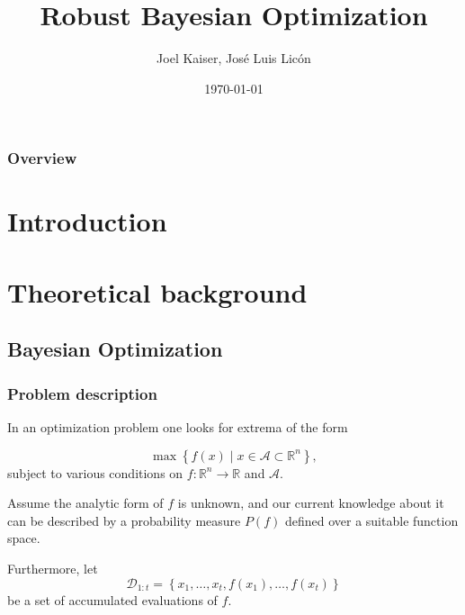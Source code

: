 \documentclass[10pt,handout]{beamer}
\title[RoBO]
{Robust Bayesian Optimization}
\author{Joel Kaiser, José Luis Licón}
\institute[Uni Freiburg] %
{
Albert-Ludwigs-Universität Freiburg \\ %
\medskip
}
\date{\today} %
\begin{document}



\begin{frame}
\titlepage %
\end{frame}

\begin{frame}
\frametitle{Overview} %
\tableofcontents %
\end{frame}


\section{Introduction}




\section{Theoretical background}


\subsection{Bayesian Optimization}


\begin{frame}
\frametitle{Problem description}

In an optimization problem one looks for extrema of the form

\[
	\max \left\{ f(x) \mid x \in \mathcal A \subset \mathbb{R}^n \right\},
\]
subject to various conditions on $f : \mathbb{R}^n \rightarrow \mathbb{R}$ and
$\mathcal{A} $.

Assume the analytic form of $f$ is unknown, and our current knowledge
about it can be described by a probability measure $P(f)$ defined over a 
suitable function space. 

Furthermore, let 
\[
 \mathcal{D}_{1:t} = \left\{ x_1 , \ldots, x_t, f(x_1), \ldots , f(x_t) \right\}
\]
be a set of accumulated evaluations of $f$. 
\end{frame}
\end{document}
